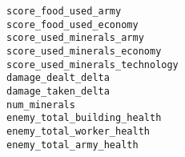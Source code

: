 \begin{description}
    \item[\texttt{score\_food\_used\_army}] 
    \item[\texttt{score\_food\_used\_economy}] 
    \item[\texttt{score\_used\_minerals\_army}] 
    \item[\texttt{score\_used\_minerals\_economy}] 
    \item[\texttt{score\_used\_minerals\_technology}] 
    \item[\texttt{damage\_dealt\_delta}] 
    \item[\texttt{damage\_taken\_delta}] 
    \item[\texttt{num\_minerals}] 
    \item[\texttt{enemy\_total\_building\_health}] 
    \item[\texttt{enemy\_total\_worker\_health}] 
    \item[\texttt{enemy\_total\_army\_health}] 
\end{description}